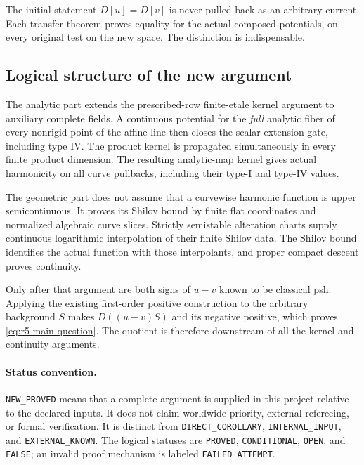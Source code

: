 \documentclass[11pt,a4paper]{article}
\numberwithin{equation}{section}
\theoremstyle{definition}
\theoremstyle{remark}
\begin{document}
The initial statement $D[u]=D[v]$ is never pulled back as an
arbitrary current. Each transfer theorem proves equality for
the actual composed potentials, on every original test on the
new space. The distinction is indispensable.

\subsection{Logical structure of the new argument}

The analytic part extends the prescribed-row finite-etale
kernel argument to auxiliary complete fields. A continuous
potential for the \emph{full} analytic fiber of every nonrigid
point of the affine line then closes the scalar-extension
gate, including type IV. The product kernel is propagated
simultaneously in every finite product dimension. The
resulting analytic-map kernel gives actual harmonicity on
all curve pullbacks, including their type-I and type-IV values.

The geometric part does not assume that a curvewise harmonic
function is upper semicontinuous. It proves its Shilov bound
by finite flat coordinates and normalized algebraic curve
slices. Strictly semistable alteration charts supply continuous
logarithmic interpolation of their finite Shilov data. The
Shilov bound identifies the actual function with those
interpolants, and proper compact descent proves continuity.

Only after that argument are both signs of $u-v$ known to be
classical psh. Applying the existing first-order positive
construction to the arbitrary background $S$ makes
$D((u-v)S)$ and its negative positive, which proves
\eqref{eq:r5-main-question}. The quotient is therefore
downstream of all the kernel and continuity arguments.

\paragraph{Status convention.}
\texttt{NEW\_PROVED} means that a complete argument is supplied
in this project relative to the declared inputs. It does not
claim worldwide priority, external refereeing, or formal
verification. It is distinct from \texttt{DIRECT\_COROLLARY},
\texttt{INTERNAL\_INPUT}, and \texttt{EXTERNAL\_KNOWN}.
The logical statuses are \texttt{PROVED},
\texttt{CONDITIONAL}, \texttt{OPEN}, and \texttt{FALSE};
an invalid proof mechanism is labeled \texttt{FAILED\_ATTEMPT}.


\end{document}

